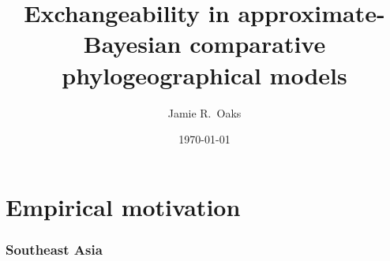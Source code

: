 



\title[Exchangeability in ABC]{Exchangeability in approximate-Bayesian
comparative phylogeographical models}

\author[J.\ Oaks]{
    Jamie R.\ Oaks %
}

\date{\today}


\maketitle



\section{Empirical motivation}
%

{
\begin{frame}
    \frametitle{Southeast Asia}    
\end{frame}
}

